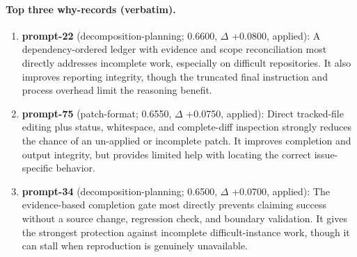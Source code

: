\paragraph{Top three why-records (verbatim).}\begin{enumerate}\itemsep1pt
\item \textbf{prompt-22} (decomposition-planning; 0.6600, $\Delta$ +0.0800, applied): A dependency-ordered ledger with evidence and scope reconciliation most directly addresses incomplete work, especially on difficult repositories. It also improves reporting integrity, though the truncated final instruction and process overhead limit the reasoning benefit.
\item \textbf{prompt-75} (patch-format; 0.6550, $\Delta$ +0.0750, applied): Direct tracked-file editing plus status, whitespace, and complete-diff inspection strongly reduces the chance of an un-applied or incomplete patch. It improves completion and output integrity, but provides limited help with locating the correct issue-specific behavior.
\item \textbf{prompt-34} (decomposition-planning; 0.6500, $\Delta$ +0.0700, applied): The evidence-based completion gate most directly prevents claiming success without a source change, regression check, and boundary validation. It gives the strongest protection against incomplete difficult-instance work, though it can stall when reproduction is genuinely unavailable.
\end{enumerate}
